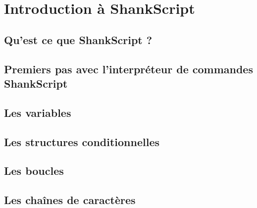 \chapter{Introduction à ShankScript}




\section{Qu'est ce que ShankScript ?}



\section{Premiers pas avec l'interpréteur de commandes ShankScript}


\section{Les variables}
\section{Les structures conditionnelles}
\section{Les boucles}
\section{Les chaînes de caractères}
